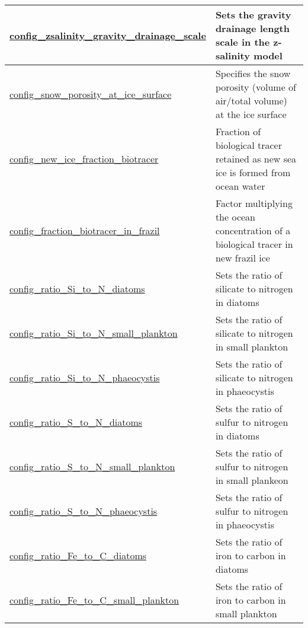 {\begin{center}
\begin{longtable}{| p{2.0in} || p{4.0in} |}
    \hline
    \hyperref[subsec:nm_sec_config_zsalinity_gravity_drainage_scale]{config\_zsalinity\_gravity\_\-drainage\_scale} & Sets the gravity drainage length scale in the z-salinity model \\
    \hline
    \hyperref[subsec:nm_sec_config_snow_porosity_at_ice_surface]{config\_snow\_porosity\_at\_ice\_\-surface} & Specifies the snow porosity (volume of air/total volume) at the ice surface \\
    \hline
    \hyperref[subsec:nm_sec_config_new_ice_fraction_biotracer]{config\_new\_ice\_fraction\_\-biotracer} & Fraction of biological tracer retained as new sea ice is formed from ocean water \\
    \hline
    \hyperref[subsec:nm_sec_config_fraction_biotracer_in_frazil]{config\_fraction\_biotracer\_in\_\-frazil} & Factor multiplying the ocean concentration of a biological tracer in new frazil ice \\
    \hline
    \hyperref[subsec:nm_sec_config_ratio_Si_to_N_diatoms]{config\_ratio\_Si\_to\_N\_diatoms} & Sets the ratio of silicate to nitrogen in diatoms \\
    \hline
    \hyperref[subsec:nm_sec_config_ratio_Si_to_N_small_plankton]{config\_ratio\_Si\_to\_N\_small\_\-plankton} & Sets the ratio of silicate to nitrogen in small plankton \\
    \hline
    \hyperref[subsec:nm_sec_config_ratio_Si_to_N_phaeocystis]{config\_ratio\_Si\_to\_N\_\-phaeocystis} & Sets the ratio of silicate to nitrogen in phaeocystis \\
    \hline
    \hyperref[subsec:nm_sec_config_ratio_S_to_N_diatoms]{config\_ratio\_S\_to\_N\_diatoms} & Sets the ratio of sulfur to nitrogen in diatoms \\
    \hline
    \hyperref[subsec:nm_sec_config_ratio_S_to_N_small_plankton]{config\_ratio\_S\_to\_N\_small\_\-plankton} & Sets the ratio of sulfur to nitrogen in small plankeon \\
    \hline
    \hyperref[subsec:nm_sec_config_ratio_S_to_N_phaeocystis]{config\_ratio\_S\_to\_N\_\-phaeocystis} & Sets the ratio of sulfur to nitrogen in phaeocystis \\
    \hline
    \hyperref[subsec:nm_sec_config_ratio_Fe_to_C_diatoms]{config\_ratio\_Fe\_to\_C\_diatoms} & Sets the ratio of iron to carbon in diatoms \\
    \hline
    \hyperref[subsec:nm_sec_config_ratio_Fe_to_C_small_plankton]{config\_ratio\_Fe\_to\_C\_small\_\-plankton} & Sets the ratio of iron to carbon in small plankton \\

\end{longtable}
\end{center}}
